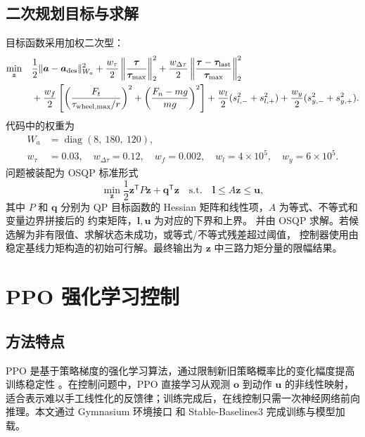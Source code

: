 \documentclass[UTF8,12pt,a4paper,fontset=none]{ctexart}
\begin{document}
\subsection{二次规划目标与求解}
目标函数采用加权二次型：
\begin{align}
\min_{\bm z}\quad
&\frac12\|\bm a-\bm a_{\rm des}\|_{W_a}^2
+\frac{w_\tau}{2}\left\|\frac{\bm\tau}{\bm\tau_{\max}}\right\|_2^2
+\frac{w_{\Delta\tau}}{2}\left\|\frac{\bm\tau-\bm\tau_{\rm last}}{\bm\tau_{\max}}\right\|_2^2\nonumber\\
&+\frac{w_f}{2}\left[
\left(\frac{F_t}{\tau_{{\rm wheel},\max}/r}\right)^2
+\left(\frac{F_n-mg}{mg}\right)^2
\right]
+\frac{w_l}{2}(s_{l,-}^2+s_{l,+}^2)
+\frac{w_y}{2}(s_{y,-}^2+s_{y,+}^2).
\end{align}
代码中的权重为
\begin{align}
W_a&=\operatorname{diag}(8,\ 180,\ 120),\\
w_\tau&=0.03,\quad
w_{\Delta\tau}=0.12,\quad
w_f=0.002,\quad
w_l=4\times10^5,\quad
w_y=6\times10^5.
\end{align}
问题被装配为 OSQP 标准形式
\begin{equation}
\min_{\bm z}\frac12\bm z^{\mathsf T}P\bm z+\bm q^{\mathsf T}\bm z
\quad\mathrm{s.t.}\quad
\bm l\le A\bm z\le\bm u,
\end{equation}
其中 $P$ 和 $\bm q$ 分别为 QP 目标函数的 Hessian 矩阵和线性项，$A$ 为等式、不等式和变量边界拼接后的
约束矩阵，$\bm l,\bm u$ 为对应的下界和上界。
并由 OSQP 求解\cite{Stellato2020OSQP}。若候选解为非有限值、求解状态未成功，或等式/不等式残差超过阈值，
控制器使用由稳定基线力矩构造的初始可行解。最终输出为 $\bm z$ 中三路力矩分量的限幅结果。

\section{PPO 强化学习控制}

\subsection{方法特点}
PPO 是基于策略梯度的强化学习算法，通过限制新旧策略概率比的变化幅度提高训练稳定性
\cite{Schulman2017PPO}。在控制问题中，PPO 直接学习从观测 $\bm o$ 到动作 $\bm u$ 的非线性映射，
适合表示难以手工线性化的反馈律；训练完成后，在线控制只需一次神经网络前向推理。本文通过 Gymnasium 环境接口
和 Stable-Baselines3 完成训练与模型加载\cite{Towers2024Gymnasium,Raffin2021SB3}。
\end{document}
